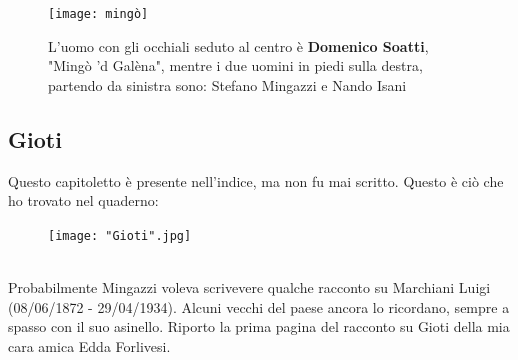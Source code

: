  \begin{figure}[htb]
    \centering
    \texttt{[image: mingò]}
    \caption*{L'uomo con gli occhiali seduto al centro è \textbf{Domenico Soatti}, "Mingò 'd Galèna", mentre i due uomini in piedi sulla destra, partendo da sinistra sono: Stefano Mingazzi e Nando Isani\label{fig:mingò}}
\end{figure}

\newpage
\subsection{Gioti}
Questo capitoletto è presente nell'indice, ma non fu mai scritto. Questo è ciò che ho trovato nel quaderno:\\
\begin{figure}[!htbp]
   \texttt{[image: "Gioti".jpg]}
\end{figure}
\\Probabilmente Mingazzi voleva scrivevere qualche racconto su Marchiani Luigi (08/06/1872 - 29/04/1934). Alcuni vecchi del paese ancora lo ricordano, sempre a spasso con il suo asinello.
\newpage
Riporto la prima pagina del racconto su Gioti della mia cara amica Edda Forlivesi.\\

